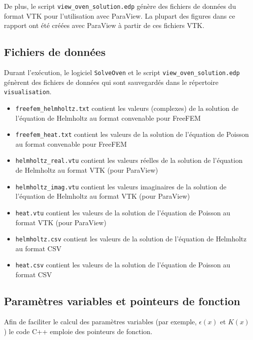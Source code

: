 De plus, le script \verb|view_oven_solution.edp| génère des fichiers de données
du format VTK pour l'utilisation avec ParaView. La plupart des figures dans ce
rapport ont été créées avec ParaView à partir de ces fichiers VTK.

\subsection{Fichiers de données}
Durant l'exécution, le logiciel \verb|SolveOven| et le script
\verb|view_oven_solution.edp| génèrent des fichiers de données qui sont
sauvegardés dans le répertoire \verb|visualisation|.

\begin{itemize}

    \item \verb|freefem_helmholtz.txt| contient les valeurs (complexes)
    de la solution de l'équation de Helmholtz au format convenable pour
    FreeFEM
    \item \verb|freefem_heat.txt| contient les valeurs de la solution
    de l'équation de Poisson au format convenable pour FreeFEM

    \item \verb|helmholtz_real.vtu| contient les valeurs réelles de la solution
    de l'équation de Helmholtz au format VTK (pour ParaView)
    \item \verb|helmholtz_imag.vtu| contient les valeurs imaginaires de la
    solution de l'équation de Helmholtz au format VTK (pour ParaView)
    \item \verb|heat.vtu| contient les valeurs de la solution de
    l'équation de Poisson au format VTK (pour ParaView)

    \item \verb|helmholtz.csv| contient les valeurs de la solution de
    l'équation de Helmholtz au format CSV
    \item \verb|heat.csv| contient les valeurs de la solution de
    l'équation de Poisson au format CSV

\end{itemize}

\subsection{Paramètres variables et pointeurs de fonction}

Afin de faciliter le calcul des paramètres variables (par exemple,
$\epsilon(x)$ et $K(x)$) le code C++ emploie des pointeurs
de fonction.

